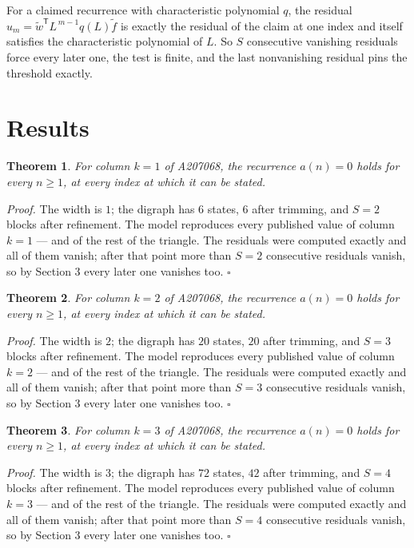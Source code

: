 \documentclass[11pt]{article}
\newtheorem{theorem}{Theorem}
\theoremstyle{definition}
\begin{document}
For a claimed recurrence with characteristic polynomial $q$, the residual $u_m = \tilde w^{\mathsf T}L^{\,m-1}q(L)\tilde f$ is exactly the residual of the claim at one index and itself satisfies the characteristic polynomial of $L$. So $S$ consecutive vanishing residuals force every later one, the test is finite, and the last nonvanishing residual pins the threshold exactly.

\section{Results}

\begin{theorem} For column $k = 1$ of A207068, the recurrence $a(n) = 0$ holds for every $n \ge 1$, at every index at which it can be stated.\end{theorem}

{\itshape Proof.} The width is $1$; the digraph has $6$ states, $6$ after trimming, and $S = 2$ blocks after refinement. The model reproduces every published value of column $k = 1$ --- and of the rest of the triangle. The residuals were computed exactly and all of them vanish; after that point more than $S = 2$ consecutive residuals vanish, so by Section 3 every later one vanishes too. $\square$

\begin{theorem} For column $k = 2$ of A207068, the recurrence $a(n) = 0$ holds for every $n \ge 1$, at every index at which it can be stated.\end{theorem}

{\itshape Proof.} The width is $2$; the digraph has $20$ states, $20$ after trimming, and $S = 3$ blocks after refinement. The model reproduces every published value of column $k = 2$ --- and of the rest of the triangle. The residuals were computed exactly and all of them vanish; after that point more than $S = 3$ consecutive residuals vanish, so by Section 3 every later one vanishes too. $\square$

\begin{theorem} For column $k = 3$ of A207068, the recurrence $a(n) = 0$ holds for every $n \ge 1$, at every index at which it can be stated.\end{theorem}

{\itshape Proof.} The width is $3$; the digraph has $72$ states, $42$ after trimming, and $S = 4$ blocks after refinement. The model reproduces every published value of column $k = 3$ --- and of the rest of the triangle. The residuals were computed exactly and all of them vanish; after that point more than $S = 4$ consecutive residuals vanish, so by Section 3 every later one vanishes too. $\square$
\end{document}
